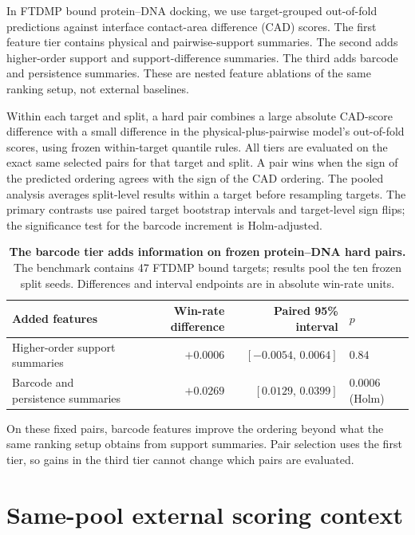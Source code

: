 \documentclass[11pt]{article}
\begin{document}
In FTDMP bound protein--DNA docking\citep{ftdmpdata}, we use target-grouped out-of-fold predictions against interface contact-area difference (CAD) scores. The first feature tier contains physical and pairwise-support summaries. The second adds higher-order support and support-difference summaries. The third adds barcode and persistence summaries. These are nested feature ablations of the same ranking setup, not external baselines.

Within each target and split, a hard pair combines a large absolute CAD-score difference with a small difference in the physical-plus-pairwise model's out-of-fold scores, using frozen within-target quantile rules. All tiers are evaluated on the exact same selected pairs for that target and split. A pair wins when the sign of the predicted ordering agrees with the sign of the CAD ordering. The pooled analysis averages split-level results within a target before resampling targets. The primary contrasts use paired target bootstrap intervals and target-level sign flips; the significance test for the barcode increment is Holm-adjusted.

\begin{table}[htbp]
\centering
\caption{\textbf{The barcode tier adds information on frozen protein--DNA hard pairs.} The benchmark contains 47 FTDMP bound targets; results pool the ten frozen split seeds. Differences and interval endpoints are in absolute win-rate units.}
\label{tab:hard}
\begin{tabular}{@{}lrrl@{}}
\toprule
Added features & Win-rate difference & Paired 95\% interval & $p$ \\
\midrule
Higher-order support summaries & $+0.0006$ & $[-0.0054,\,0.0064]$ & $0.84$ \\
Barcode and persistence summaries & $+0.0269$ & $[0.0129,\,0.0399]$ & $0.0006$ (Holm) \\
\bottomrule
\end{tabular}
\end{table}

On these fixed pairs, barcode features improve the ordering beyond what the same ranking setup obtains from support summaries. Pair selection uses the first tier, so gains in the third tier cannot change which pairs are evaluated.

\section{Same-pool external scoring context}
\end{document}
